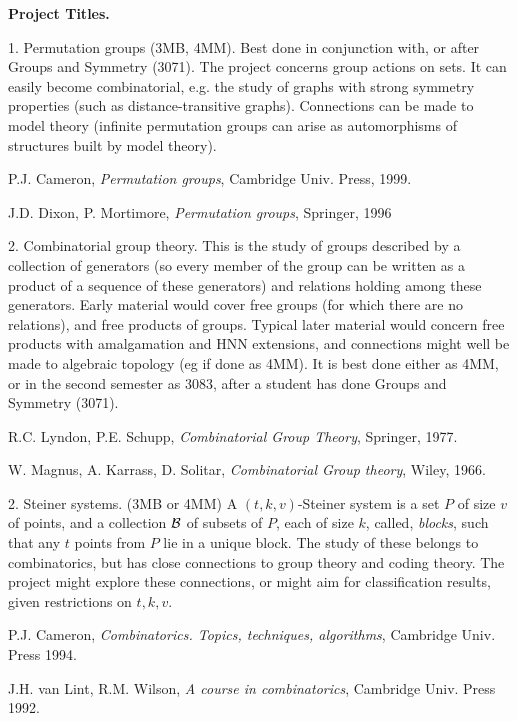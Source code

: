 

{\bf Project Titles.}

\medskip

1. Permutation  groups (3MB, 4MM). Best done in conjunction with, or after Groups and Symmetry (3071).
The project concerns group actions on sets. It can easily become combinatorial, e.g. the study of graphs 
with strong symmetry properties (such as distance-transitive graphs). Connections can be made
to model theory (infinite permutation groups can arise as automorphisms of structures built by model theory).

P.J. Cameron, {\em Permutation groups}, Cambridge Univ. Press, 1999.

J.D. Dixon, P. Mortimore, {\em Permutation groups}, Springer, 1996

\medskip

2. Combinatorial group theory. This is the study of groups described by a collection of generators
(so every member of the group can be written as a product of a sequence of these generators) and
 relations holding among these generators. 
Early material would cover free groups (for which there are no relations), and free products of groups.
Typical later material would concern free products with amalgamation and HNN extensions, and connections
 might well be made to algebraic topology (eg if done as 4MM).
 It is best 
done either as 4MM, or in the second semester as 3083, after a student has done Groups and Symmetry (3071).

R.C. Lyndon, P.E. Schupp, {\em Combinatorial Group Theory}, Springer, 1977.

W. Magnus, A. Karrass, D. Solitar, {\em Combinatorial Group theory}, Wiley, 1966.

\medskip

2. Steiner systems. (3MB or 4MM) A $(t,k,v)$-Steiner system is a set $P$ of
 size $v$ of points, and a collection ${\cal B}$ of subsets of $P$, each of size $k$, called, {\em blocks}, such that
any $t$ points from $P$ lie in a unique block. The study of these belongs to combinatorics, but has close connections
 to group theory and coding theory. The project might explore these connections, or might aim for classification 
results, given restrictions on $t,k,v$.

P.J. Cameron, {\em Combinatorics. Topics, techniques, algorithms}, Cambridge Univ. Press 1994.

J.H. van Lint, R.M. Wilson, {\em A course in combinatorics}, Cambridge Univ. Press 1992.

